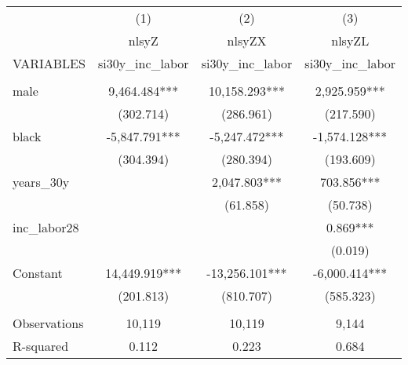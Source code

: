 \begin{tabular}{lccc} \hline
 & (1) & (2) & (3) \\
 & nlsyZ & nlsyZX & nlsyZL \\
VARIABLES & si30y\_inc\_labor & si30y\_inc\_labor & si30y\_inc\_labor \\ \hline
 &  &  &  \\
male & 9,464.484*** & 10,158.293*** & 2,925.959*** \\
 & (302.714) & (286.961) & (217.590) \\
black & -5,847.791*** & -5,247.472*** & -1,574.128*** \\
 & (304.394) & (280.394) & (193.609) \\
years\_30y &  & 2,047.803*** & 703.856*** \\
 &  & (61.858) & (50.738) \\
inc\_labor28 &  &  & 0.869*** \\
 &  &  & (0.019) \\
Constant & 14,449.919*** & -13,256.101*** & -6,000.414*** \\
 & (201.813) & (810.707) & (585.323) \\
 &  &  &  \\
Observations & 10,119 & 10,119 & 9,144 \\
 R-squared & 0.112 & 0.223 & 0.684 \\ \hline
\end{tabular}
